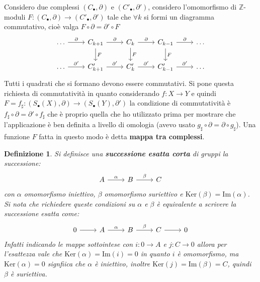\documentclass[10pt, twoside=false, x11names]{scrbook}
\newtheorem{definition}[theorem]{Definizione}
\newcommand{\Z}{\mathbb{Z}}
\newcommand{\im}[1]{\mathrm{Im}( #1 )}
\renewcommand{\ker}[1]{\mathrm{Ker}( #1)}
\begin{document}
Considero due complessi $ (C_\bullet, \partial) $ e $ (C'_\bullet, \partial') $,
considero l'omomorfismo di $ \Z $-moduli $ F \colon (C_\bullet, \partial) \to (C'_\bullet, \partial') $
tale che $ \forall k $ si formi un diagramma commutativo,
cioè valga $ F \circ \partial = \partial' \circ F $
\[
  \begin{tikzcd}
    \dots \arrow{r}{\partial} &  C_{k+1}  \arrow{r}{\partial} \arrow{d}{F} &  C_{k}  \arrow{r}{\partial} \arrow{d}{F} & C_{k-1}  \arrow{r}{\partial} \arrow{d}{F} & \dots \\
   \dots \arrow{r}{\partial'} &  C'_{k+1}  \arrow{r}{\partial'} &  C'_{k}  \arrow{r}{\partial'}  &  C'_{k-1} \arrow{r}{\partial'} & \dots
  \end{tikzcd}
\]
Tutti i quadrati che si formano devono essere
commutativi. Si pone questa richiesta di commutatività
in quanto considerando $ f \colon X \to Y $ e quindi
$ F = f_\sharp \colon (S_\bullet(X), \partial) \to  (S_\bullet(Y), \partial') $ la condizione
di commutatività è $ f_\sharp \circ \partial = \partial' \circ f_\sharp $ che è
proprio quella che ho utilizzato prima per mostrare
che l'applicazione è ben definita a livello
di omologia (avevo usato $ g_\sharp \circ \partial = \partial \circ g_\sharp $).
Una funzione $ F $ fatta in questo modo è detta
\textbf{mappa tra complessi}.

\begin{definition}
  Si definisce una \textbf{successione esatta corta} di
  gruppi la successione:
  \[
    \begin{tikzcd}
       A \arrow{r}{\alpha} & B \arrow{r}{\beta} & C
    \end{tikzcd}
  \]
  con $ \alpha $ omomorfismo iniettivo, $ \beta $ omomorfismo suriettivo e $ \ker{\beta} = \im{\alpha} $.
  Si nota che richiedere queste condizioni su $ \alpha $ e $ \beta $ è equivalente a scrivere la
  successione esatta come:
  \[
    \begin{tikzcd}
      0 \arrow{r}{} & A \arrow{r}{\alpha} & B\arrow{r}{\beta} & C \arrow{r}{} & 0
    \end{tikzcd}
  \]
  Infatti indicando le mappe sottointese con $ i \colon 0 \to A $ e $ j \colon C \to 0 $
  allora per l'esattezza vale che $ \ker{\alpha} = \im{i} = 0 $ in quanto $ i $ è
  omomorfismo, ma $ \ker{\alpha} = 0 $ signfiica che $ \alpha $ è iniettivo, inoltre
  $ \ker{j} = \im{\beta} = C $, quindi $ \beta $ è suriettiva.
\end{definition}
\end{document}
